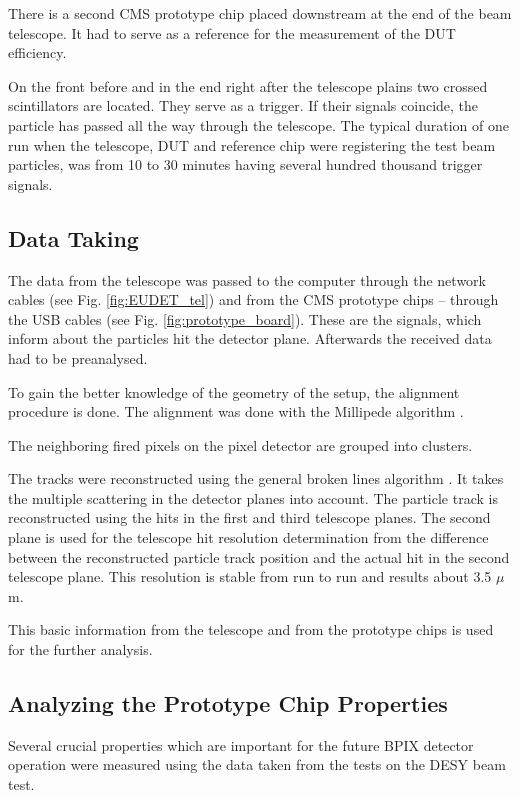 There is a second CMS prototype chip placed downstream at the end of the beam telescope. It had to serve as a reference for the
measurement of the DUT efficiency.

On the front before and in the end right after the telescope plains two crossed scintillators are located. They serve as a trigger. 
If their signals coincide, the particle has passed all the way through the telescope.
The typical duration of one run when the telescope, DUT and reference chip were registering the test beam particles, was from 10
to 30 minutes having several hundred thousand trigger signals.

\subsection{Data Taking}

The data from the telescope was passed to the computer through the network cables (see Fig. \ref{fig:EUDET_tel}) and from
the CMS prototype chips -- through the USB cables (see Fig. \ref{fig:prototype_board}). These are the signals, which inform
about the particles hit the detector plane.  Afterwards the received data had to be preanalysed. 

To gain the better knowledge of the geometry of the setup, the alignment procedure is done. The alignment was done with the
Millipede algorithm \cite{1748-0221-3-09-P09002}.

The neighboring fired pixels on the pixel detector are grouped into clusters.

The tracks were reconstructed using the general broken lines algorithm \cite{Blobel:2006yi}. It takes the multiple scattering
in the detector planes into account. The particle track is reconstructed using the hits in the first and third telescope planes.
The second plane is used for the telescope hit resolution determination from the difference between the reconstructed particle
track position and the actual hit in the second telescope plane. This resolution is stable from run to run and results about
3.5 $\mu$m.

This basic information from the telescope and from the prototype chips is used for the further analysis.

\subsection{Analyzing the Prototype Chip Properties}

Several crucial properties which are important for the future BPIX detector operation were measured using the data taken from the 
tests on the DESY beam test.

